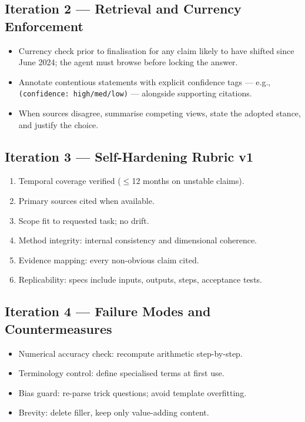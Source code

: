 \documentclass[11pt,a4paper]{article}
\numberwithin{equation}{section}
\begin{document}
\subsection*{Iteration 2 --- Retrieval and Currency Enforcement}
\begin{summarybox}[title={Changes Introduced: Currency Checks, Source Confidence, Conflict Resolution}]
\begin{itemize}
  \item Currency check prior to finalisation for any claim likely to have shifted since June 2024; the agent must browse before locking the answer.
  \item Annotate contentious statements with explicit confidence tags --- e.g., \texttt{(confidence: high/med/low)} --- alongside supporting citations.
  \item When sources disagree, summarise competing views, state the adopted stance, and justify the choice.
\end{itemize}
\end{summarybox}

\subsection*{Iteration 3 --- Self-Hardening Rubric v1}
\begin{summarybox}[title={Changes Introduced: Measurable Output Checks}]
\begin{enumerate}[label=\arabic*.]
  \item Temporal coverage verified (\(\leq\)12 months on unstable claims).
  \item Primary sources cited when available.
  \item Scope fit to requested task; no drift.
  \item Method integrity: internal consistency and dimensional coherence.
  \item Evidence mapping: every non-obvious claim cited.
  \item Replicability: specs include inputs, outputs, steps, acceptance tests.
\end{enumerate}
\end{summarybox}

\subsection*{Iteration 4 --- Failure Modes and Countermeasures}
\begin{summarybox}[title={Changes Introduced: Error Checklists and Brevity Pass}]
\begin{itemize}
  \item Numerical accuracy check: recompute arithmetic step-by-step.
  \item Terminology control: define specialised terms at first use.
  \item Bias guard: re-parse trick questions; avoid template overfitting.
  \item Brevity: delete filler, keep only value-adding content.
\end{itemize}
\end{summarybox}
\end{document}

